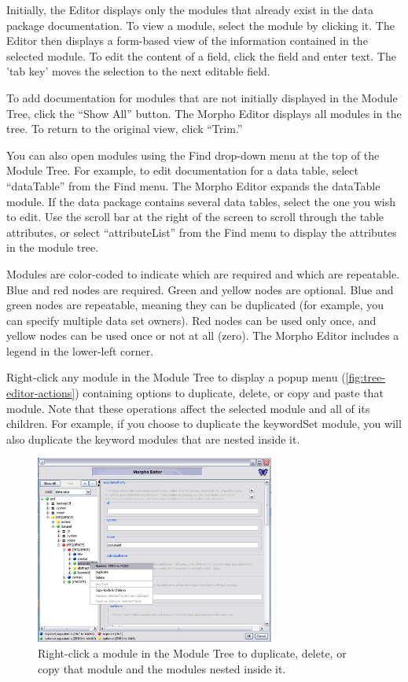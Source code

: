 Initially, the Editor displays only the modules that already exist in
the data package documentation. To view a module, select the module by
clicking it. The Editor then displays a form-based view of the
information contained in the selected module. To edit the content of a
field, click the field and enter text. The 'tab key' moves the selection
to the next editable field. 

To add documentation for modules that are not initially displayed in the
Module Tree, click the ``Show All'' button. The Morpho Editor displays
all modules in the tree. To return to the original view, click ``Trim.'' 

You can also open modules using the Find drop-down menu at the top of
the Module Tree. For example, to edit documentation for a data table,
select ``dataTable'' from the Find menu. The Morpho Editor expands the
dataTable module. If the data package contains several data tables,
select the one you wish to edit. Use the scroll bar at the right of the
screen to scroll through the table attributes, or select
``attributeList'' from the Find menu to display the attributes in the
module tree.

Modules are color-coded to indicate which are required and which are
repeatable. Blue and red nodes are required. Green and yellow nodes are
optional. Blue and green nodes are repeatable, meaning they can be
duplicated (for example, you can specify multiple data set owners). Red
nodes can be used only once, and yellow nodes can be used once or not at
all (zero). The Morpho Editor includes a legend in the lower-left
corner.

Right-click any module in the Module Tree to display a popup menu
(\autoref{fig:tree-editor-actions}) containing options to duplicate,
delete, or copy and paste that module. Note that these operations affect
the selected module and all of its children. For example, if you choose
to duplicate the keywordSet module, you will also duplicate the keyword
modules that are nested inside it.

\begin{figure}
  \centering
    \includegraphics[width=0.7\textwidth]{images/tree-editor-actions.jpg}
  \caption{Right-click a module in the Module Tree to duplicate, delete,
    or copy that module and the modules nested inside it.}
  \label{fig:tree-editor-actions}
\end{figure}
